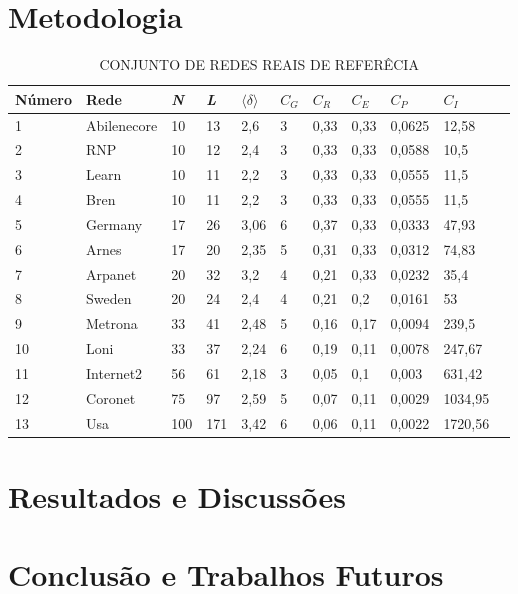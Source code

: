 \documentclass[12pt]{article}
\begin{document}
\section{Metodologia}\label{sec:met}
\begin{table}[htp]
\caption{CONJUNTO DE REDES REAIS DE REFERÊCIA}\label{tab:tab1}
\centering
\begin{tabular}{l*{9}{l}r}
\hline\rowcolor{Gray}
Número & Rede & \textit{N} & \textit{L} & $\langle \delta \rangle$ & $C_G$ & $C_R$ & $C_E$ & $C_P$ & $C_I$\\ 
\hline
1   &Abilenecore &10    &13     &2,6    &3   &0,33    &0,33     &0,0625     & 12,58\\
2   &RNP        &10     &12     & 2,4   &3   &0,33    &0,33     &0,0588     &10,5\\
3   &Learn      &10     & 11    &2,2    &3   &0,33    &0,33     &0,0555     &11,5\\
4   &Bren       &10     & 11    &2,2    &3   &0,33    &0,33     &0,0555     &11,5\\
5   &Germany    &17     & 26    &3,06   &6   &0,37    &0,33     &0,0333     &47,93\\
6   &Arnes      &17     & 20    &2,35   &5   &0,31    &0,33     &0,0312     &74,83\\
7   &Arpanet    &20     & 32    &3,2    &4   & 0,21   &0,33     & 0,0232    &35,4\\
8   &Sweden     &20     & 24    &2,4    &4   & 0,21   &0,2&     0,0161      &53\\
9   &Metrona    &33     & 41    &2,48   &5   & 0,16   &0,17     & 0,0094    &239,5\\
10  &Loni       &33     & 37    &2,24   & 6  & 0,19   &0,11     & 0,0078    &247,67\\
11  &Internet2  &56     & 61    &2,18   & 3  & 0,05   &0,1      &0,003      &631,42\\
12  &Coronet    &75     & 97    & 2,59  & 5  & 0,07   &0,11     & 0,0029    &1034,95\\
13  &Usa        &100    &171    & 3,42  & 6  &0,06    &0,11     & 0,0022    &1720,56\\
\hline
\end{tabular}
\end{table}
\section{Resultados e Discussões}\label{sec:result}


\section{Conclusão e Trabalhos Futuros}\label{sec:conc}



\end{document}
